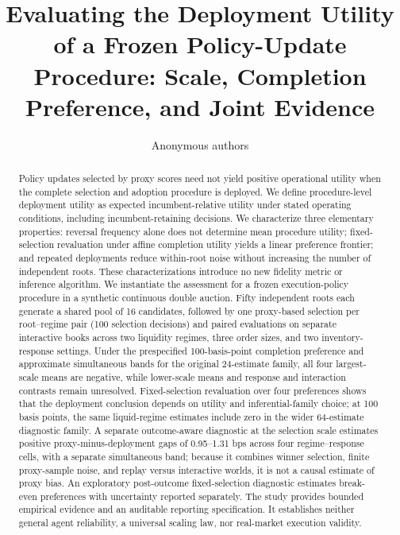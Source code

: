 \documentclass[10pt,letterpaper]{article}
\title{Evaluating the Deployment Utility of a Frozen Policy-Update Procedure: Scale, Completion Preference, and Joint Evidence}
\author{Anonymous authors}
\date{}
\begin{document}
\maketitle
\setcounter{footnote}{1}
\setcounter{footnote}{0}
\begin{abstract}
Policy updates selected by proxy scores need not yield positive operational utility when the complete selection and adoption procedure is deployed. We define procedure-level deployment utility as expected incumbent-relative utility under stated operating conditions, including incumbent-retaining decisions. We characterize three elementary properties: reversal frequency alone does not determine mean procedure utility; fixed-selection revaluation under affine completion utility yields a linear preference frontier; and repeated deployments reduce within-root noise without increasing the number of independent roots. These characterizations introduce no new fidelity metric or inference algorithm. We instantiate the assessment for a frozen execution-policy procedure in a synthetic continuous double auction. Fifty independent roots each generate a shared pool of 16 candidates, followed by one proxy-based selection per root--regime pair (100 selection decisions) and paired evaluations on separate interactive books across two liquidity regimes, three order sizes, and two inventory-response settings. Under the prespecified 100-basis-point completion preference and approximate simultaneous bands for the original 24-estimate family, all four largest-scale means are negative, while lower-scale means and response and interaction contrasts remain unresolved. Fixed-selection revaluation over four preferences shows that the deployment conclusion depends on utility and inferential-family choice; at 100 basis points, the same liquid-regime estimates include zero in the wider 64-estimate diagnostic family. A separate outcome-aware diagnostic at the selection scale estimates positive proxy-minus-deployment gaps of 0.95--1.31 bps across four regime--response cells, with a separate simultaneous band; because it combines winner selection, finite proxy-sample noise, and replay versus interactive worlds, it is not a causal estimate of proxy bias. An exploratory post-outcome fixed-selection diagnostic estimates break-even preferences with uncertainty reported separately. The study provides bounded empirical evidence and an auditable reporting specification. It establishes neither general agent reliability, a universal scaling law, nor real-market execution validity.
\end{abstract}
\end{document}
